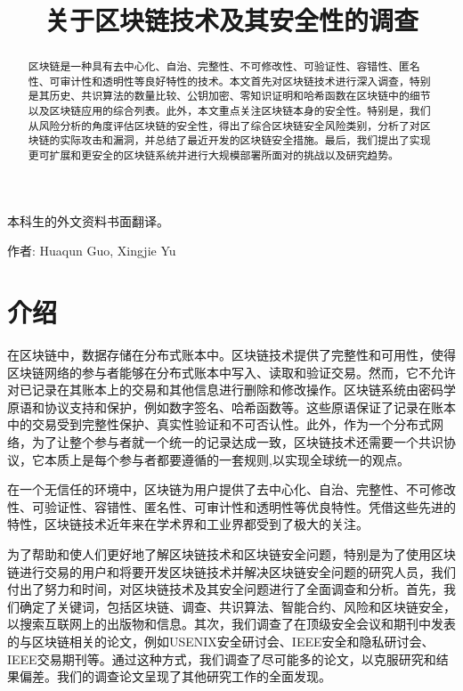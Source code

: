 
\begin{translation}
\label{cha:translation}

\title{关于区块链技术及其安全性的调查}
\maketitle

\tableofcontents

本科生的外文资料书面翻译。

作者: Huaqun Guo, Xingjie Yu

\begin{abstract}
区块链是一种具有去中心化、自治、完整性、不可修改性、可验证性、容错性、匿名性、可审计性和透明性等良好特性的技术。本文首先对区块链技术进行深入调查，特别是其历史、共识算法的数量比较、公钥加密、零知识证明和哈希函数在区块链中的细节以及区块链应用的综合列表。此外，本文重点关注区块链本身的安全性。特别是，我们从风险分析的角度评估区块链的安全性，得出了综合区块链安全风险类别，分析了对区块链的实际攻击和漏洞，并总结了最近开发的区块链安全措施。最后，我们提出了实现更可扩展和更安全的区块链系统并进行大规模部署所面对的挑战以及研究趋势。

\end{abstract}

\section{介绍}

在区块链中，数据存储在分布式账本中。区块链技术提供了完整性和可用性，使得区块链网络的参与者能够在分布式账本中写入、读取和验证交易。然而，它不允许对已记录在其账本上的交易和其他信息进行删除和修改操作。区块链系统由密码学原语和协议支持和保护，例如数字签名、哈希函数等。这些原语保证了记录在账本中的交易受到完整性保护、真实性验证和不可否认性。此外，作为一个分布式网络，为了让整个参与者就一个统一的记录达成一致，区块链技术还需要一个共识协议，它本质上是每个参与者都要遵循的一套规则,以实现全球统一的观点。

在一个无信任的环境中，区块链为用户提供了去中心化、自治、完整性、不可修改性、可验证性、容错性、匿名性、可审计性和透明性等优良特性\cite{art1,art2,art3}。凭借这些先进的特性，区块链技术近年来在学术界和工业界都受到了极大的关注。

为了帮助和使人们更好地了解区块链技术和区块链安全问题，特别是为了使用区块链进行交易的用户和将要开发区块链技术并解决区块链安全问题的研究人员，我们付出了努力和时间，对区块链技术及其安全问题进行了全面调查和分析。首先，我们确定了关键词，包括区块链、调查、共识算法、智能合约、风险和区块链安全，以搜索互联网上的出版物和信息。其次，我们调查了在顶级安全会议和期刊中发表的与区块链相关的论文，例如USENIX安全研讨会、IEEE安全和隐私研讨会、IEEE交易期刊等。通过这种方式，我们调查了尽可能多的论文，以克服研究和结果偏差。我们的调查论文呈现了其他研究工作的全面发现。


\end{translation}
